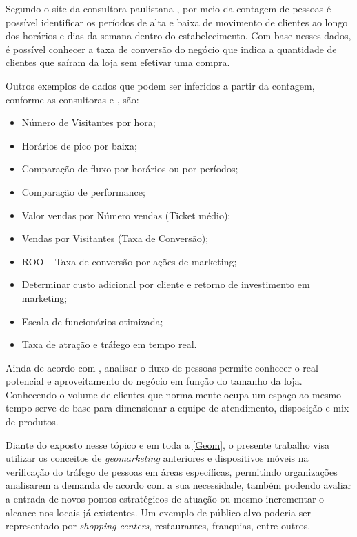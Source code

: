 Segundo o site da consultora paulistana , por meio da contagem de pessoas é possível identificar os períodos de alta e baixa de movimento de clientes ao longo dos horários e dias da semana dentro do estabelecimento. Com base nesses dados, é possível conhecer a taxa de conversão do negócio que indica a quantidade de clientes que saíram da loja sem efetivar uma compra.

Outros exemplos de dados que podem ser inferidos a partir da contagem, conforme as consultoras  e , são:

\begin{itemize}
  \item Número de Visitantes por hora;
  \item Horários de pico por baixa;
  \item Comparação de fluxo por horários ou por períodos;
  \item Comparação de performance;
  \item Valor vendas por Número vendas (Ticket médio);
  \item Vendas por Visitantes (Taxa de Conversão);
  \item ROO – Taxa de conversão por ações de marketing;
  \item Determinar custo adicional por cliente e retorno de investimento em marketing;
  \item Escala de funcionários otimizada;
  \item Taxa de atração e tráfego em tempo real.
\end{itemize}

Ainda de acordo com , analisar o fluxo de pessoas permite conhecer o real potencial e aproveitamento do negócio em função do tamanho da loja. Conhecendo o volume de clientes que normalmente ocupa um espaço ao mesmo tempo serve de base para dimensionar a equipe de atendimento, disposição e mix de produtos.

Diante do exposto nesse tópico e em toda a \autoref{Geom}, o presente trabalho
visa utilizar os conceitos de \emph{geomarketing} anteriores e dispositivos móveis na
verificação do tráfego de pessoas em áreas específicas, permitindo organizações analisarem a
demanda de acordo com a sua necessidade, também podendo avaliar a entrada
de novos pontos estratégicos de atuação ou mesmo incrementar o alcance nos
locais já existentes. Um exemplo de público-alvo poderia ser representado por
\emph{shopping centers}, restaurantes, franquias, entre outros.

